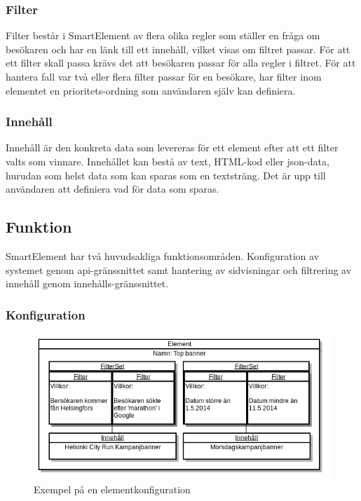 \subsubsection{Filter}

Filter består i SmartElement av flera olika regler som ställer en fråga om besökaren och har en länk till ett innehåll, vilket visas om filtret passar. För att ett filter skall passa krävs det att besökaren passar för alla regler i filtret. För att hantera fall var två eller flera filter passar för en besökare, har filter inom elementet en prioritets-ordning som användaren själv kan definiera.

\subsubsection{Innehåll}

Innehåll är den konkreta data som levereras för ett element efter att ett filter valts som vinnare. Innehållet kan bestå av text, HTML-kod eller \gls{json}-data, hurudan som helst data som kan sparas som en textsträng. Det är upp till användaren att definiera vad för data som sparas.

\subsection{Funktion}

SmartElement har två huvudsakliga funktionsområden. Konfiguration av systemet genom \gls{api}-gränssnittet samt hantering av sidvisningar och filtrering av innehåll genom innehålls-gränssnittet.

\subsubsection{Konfiguration}

\begin{figure}[h!]
\centering
\includegraphics[width=150mm]{assets/images/smelementelement.png}
\caption{Exempel på en elementkonfiguration}
\label{smelementelement}
\end{figure}

